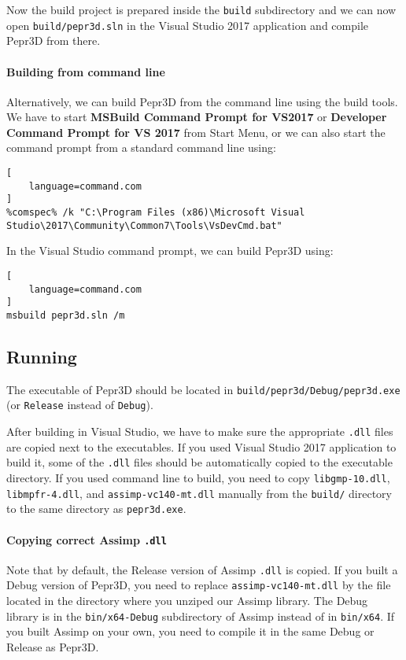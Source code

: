 Now the build project is prepared inside the \texttt{build} subdirectory and we can now open \texttt{build/pepr3d.sln} in the Visual Studio 2017 application and compile Pepr3D from there.

\paragraph{Building from command line}
Alternatively, we can build Pepr3D from the command line using the build tools. We have to start \textbf{MSBuild Command Prompt for VS2017} or \textbf{Developer Command Prompt for VS 2017} from Start Menu, or we can also start the command prompt from a standard command line using:

\begin{lstlisting}[
    language=command.com
]
%comspec% /k "C:\Program Files (x86)\Microsoft Visual Studio\2017\Community\Common7\Tools\VsDevCmd.bat"
\end{lstlisting}

In the Visual Studio command prompt, we can build Pepr3D using:

\begin{lstlisting}[
    language=command.com
]
msbuild pepr3d.sln /m
\end{lstlisting}

\subsection{Running}

The executable of Pepr3D should be located in \texttt{build/\-pepr3d/\-Debug/\-pe\-pr\-3d.exe} (or \texttt{Release} instead of \texttt{Debug}).

After building in Visual Studio, we have to make sure the appropriate \texttt{.dll} files are copied next to the executables.
If you used Visual Studio 2017 application to build it, some of the \texttt{.dll} files should be automatically copied to the executable directory.
If you used command line to build, you need to copy \texttt{libgmp-10.dll}, \texttt{libmpfr-4.dll}, and \texttt{assimp-vc140-mt.dll} manually from the \texttt{build/} directory to the same directory as \texttt{pepr3d.exe}.

\paragraph{Copying correct Assimp \texttt{.dll}}
Note that by default, the Release version of Assimp \texttt{.dll} is copied.
If you built a Debug version of Pepr3D, you need to replace \texttt{assimp-vc140-mt.dll} by the file located in the directory where you unziped our Assimp library.
The Debug library is in the \texttt{bin/x64-Debug} subdirectory of Assimp instead of in \texttt{bin/x64}.
If you built Assimp on your own, you need to compile it in the same Debug or Release as Pepr3D.

